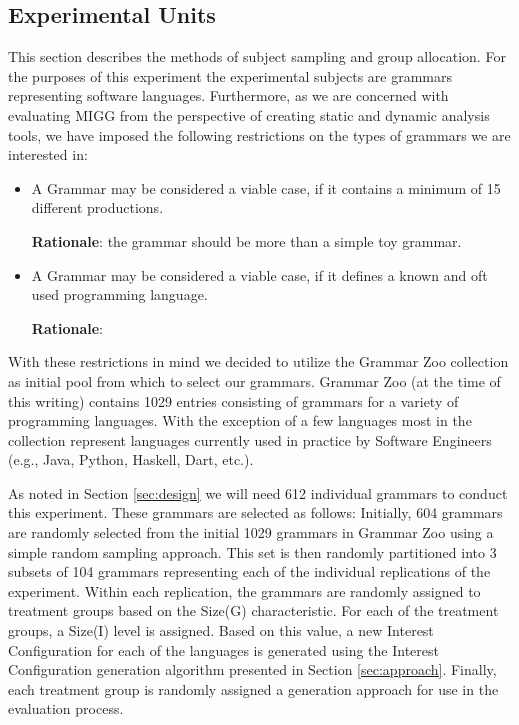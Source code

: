 \documentclass[10pt,nocc]{xrese_report}
\begin{document}
\subsection{Experimental Units}

This section describes the methods of subject sampling and group allocation. For the purposes
of this experiment the experimental subjects are grammars representing software languages. Furthermore,
as we are concerned with evaluating MIGG from the perspective of creating static and dynamic analysis tools,
we have imposed the following restrictions on the types of grammars we are interested in:

\begin{itemize}
\item A Grammar may be considered a viable case, if it contains a minimum of 15 different productions.

  \textbf{Rationale}: the grammar should be more than a simple toy grammar.

\item A Grammar may be considered a viable case, if it defines a known and oft used programming language.

  \textbf{Rationale}:
\end{itemize}

With these restrictions in mind we decided to utilize the Grammar Zoo  collection as initial pool from which to select our grammars. Grammar Zoo (at the time of this writing) contains 1029 entries consisting of grammars for a variety of programming languages. With the exception of a few languages most in the collection represent languages currently used in practice by Software Engineers (e.g., Java, Python, Haskell, Dart, etc.).

As noted in Section \ref{sec:design} we will need 612 individual grammars to conduct this experiment. These grammars are selected as follows: Initially, 604 grammars are randomly selected from the initial 1029 grammars in Grammar Zoo using a simple random sampling approach. This set is then randomly partitioned into 3 subsets of 104 grammars representing each of the individual replications of the experiment. Within each replication, the grammars are randomly assigned to treatment groups based on the Size(G) characteristic. For each of the treatment groups, a Size(I) level is assigned. Based on this value, a new Interest Configuration for each of the languages is generated using the Interest Configuration generation algorithm presented in Section \ref{sec:approach}. Finally, each treatment group is randomly assigned a generation approach for use in the evaluation process.
\end{document}
